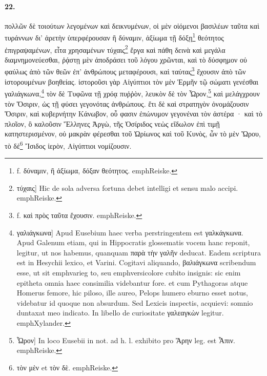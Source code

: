 \documentclass[a4paper, 11pt, oneside, polutonikogreek, german]{article}
\begin{document}
\paragraph{22.}
πολλῶν δὲ τοιούτων λεγομένων καὶ δεικνυμένων, οἱ μὲν οἰόμενοι βασιλέων ταῦτα καὶ τυράννων δι' ἀρετὴν ὑπερφέρουσαν ἢ δύναμιν, ἀξίωμα τῇ δόξῃ\footnote{f. δύναμιν, ἢ ἀξίωμα, δόξαν θεότητος. emph{Reiske.}} θεότητος ἐπιγραψαμένων, εἶτα χρησαμένων τύχαις\footnote{τύχαις] Hic de sola adversa fortuna debet intelligi et sensu malo accipi. emph{Reiske.}} ἔργα καὶ πάθη δεινὰ καὶ μεγάλα διαμνημονεύεσθαι, ῥᾴστῃ μὲν ἀποδράσει τοῦ λόγου χρῶνται, καὶ τὸ δύσφημον οὐ φαύλως ἀπὸ τῶν θεῶν ἐπ' ἀνθρώπους μεταφέρουσι, καὶ ταύτας\footnote{f. καὶ πρὸς ταῦτα ἔχουσιν. emph{Reiske.}} ἔχουσιν ἀπὸ τῶν ἱστορουμένων βοηθείας. ἱστοροῦσι γὰρ Αἰγύπτιοι τὸν μὲν Ἑρμῆν τῷ σώματι γενέσθαι γαλιάγκωνα,\footnote{γαλιάγκωνα] Apud Eusebium haec verba perstringentem est γαλκάγκωνα. Apud Galenum etiam, qui in Hippocratis glossematis vocem hanc reponit, legitur, ut nos habemus, quanquam παρὰ τὴν γαλῆν deducat. Eadem scriptura est in Hesychii lexico, et Varini. Cogitavi aliquando, βαλιάγκωνα scribendum esse, ut sit emph{varieg to}, seu emph{versicolore cubito insignis}: sic enim epitheta omnia haec consimilia videbantur fore. et cum Pythagoras atque Homerus femore, hic piloso, ille aureo, Pelops humero eburno esset notus, videbatur id quoque non absurdum. Sed Lexicis inspectis, acquievi: somnio duntaxat meo indicato. In libello de curiositate γαλεαγκὼν legitur. emph{Xylander.}} τὸν δὲ Τυφῶνα τῇ χρόᾳ πυῤῥὸν, λευκὸν δὲ τὸν Ὦρον,\footnote{Ὦρον] In loco Eusebii in not. ad h. l. exhibito pro Ἄρην leg. est Ἆπιν. emph{Reiske.}} καὶ μελάγχρουν τὸν Ὄσιριν, ὡς τῇ φύσει γεγονότας ἀνθρώπους. ἔτι δὲ καὶ στρατηγὸν ὀνομάζουσιν Ὄσιριν, καὶ κυβερνήτην Κάνωβον, οὗ φασιν ἐπώνυμον γεγονέναι τὸν ἀστέρα · καὶ τὸ πλοῖον, ὃ καλοῦσιν Ἕλληνες Ἀργὼ, τῆς Ὀσίριδος νεὼς εἴδωλον ἐπὶ τιμῇ κατηστερισμένον, οὐ μακρὰν φέρεσθαι τοῦ Ὠρίωνος καὶ τοῦ Κυνὸς, ὧν τὸ μὲν Ὥρου, τὸ δὲ\footnote{τὸν μὲν et τὸν δὲ. emph{Reiske.}} Ἴσιδος ἱερὸν, Αἰγύπτιοι νομίζουσιν.
\end{document}

